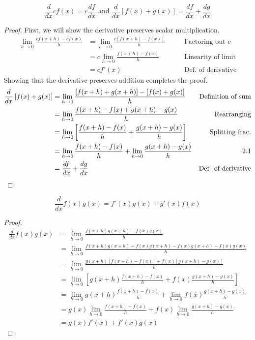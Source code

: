 \documentclass{article}
\begin{document}
\begin{theorem}
    $$
        \frac{d}{dx} c f(x) = c \frac{df}{dx} \text { and } \frac{d}{dx} \left[ f(x) + g(x) \right] = \frac{df}{dx} + \frac{dg}{dx}
    $$
\end{theorem}
\begin{proof}
First, we will show the derivative preserves scalar multiplication.
\begin{align*}
\lim_{h \to 0} \frac{cf(x + h) - cf(x)}{h} &= \lim_{h \to 0} \frac{c[f(x + h) - f(x)]}{h} \hspace{2em} & \text{Factoring out $c$} \\
&= c \lim_{h \to 0} \frac{f(x + h) - f(x)}{h} & \text{Linearity of limit} \\
&= c f'(x) & \text{Def. of derivative}
\end{align*}
Showing that the derivative preserves addition completes the proof.
\begin{align*}
\frac{d}{dx} \left[ f(x) + g(x) \right] &= \lim_{h \to 0} \frac{[f(x + h) + g(x + h)] - [f(x) + g(x)]}{h} \hspace{0.5em} & \text{Definition of sum} \\
&= \lim_{h \to 0} \frac{f(x + h) - f(x) + g(x + h) - g(x)}{h} & \text{Rearranging} \\
&= \lim_{h \to 0} \left[ \frac{f(x + h) - f(x)}{h} + \frac{g(x + h) - g(x)}{h} \right] & \text{Splitting frac.} \\
&= \lim_{h \to 0} \frac{f(x + h) - f(x)}{h} + \lim_{h \to 0} \frac{g(x + h) - g(x)}{h} & \text{2.1} \\
&= \frac{df}{dx} + \frac{dg}{dx} & \text{Def. of derivative}
\end{align*}
\end{proof}

\begin{theorem}
    $$\frac{d}{dx} f(x)g(x) = f'(x)g(x) + g'(x)f(x)$$
\end{theorem}
\begin{proof}
    \begin{align*}
    \frac{d}{dx} f(x)g(x) &= \lim_{h \to 0} \frac{f(x + h)g(x + h) - f(x)g(x)}{h} \\
    &= \lim_{h \to 0} \frac{f(x + h)g(x + h) + f(x)g(x + h) - f(x)g(x +h) - f(x)g(x)}{h} \\
    &= \lim_{h \to 0} \frac{g(x + h) [f(x + h) - f(x)] + f(x) [g(x + h) - g(x)]}{h} \\
    &= \lim_{h \to 0}\left[ g(x + h) \frac{f(x + h) - f(x)}{h} + f(x)\frac{g(x + h) - g(x)}{h} \right] \\
    &= \lim_{h \to 0} g(x + h) \frac{f(x + h) - f(x)}{h} + \lim_{h \to 0} f(x)\frac{g(x + h) - g(x)}{h} \\
    &= g(x) \lim_{h \to 0} \frac{f(x + h) - f(x)}{h} + f(x) \lim_{h \to 0} \frac{g(x + h) - g(x)}{h} \\
    &= g(x)f'(x) + f'(x)g(x)
    \end{align*}
\end{proof}
\end{document}
